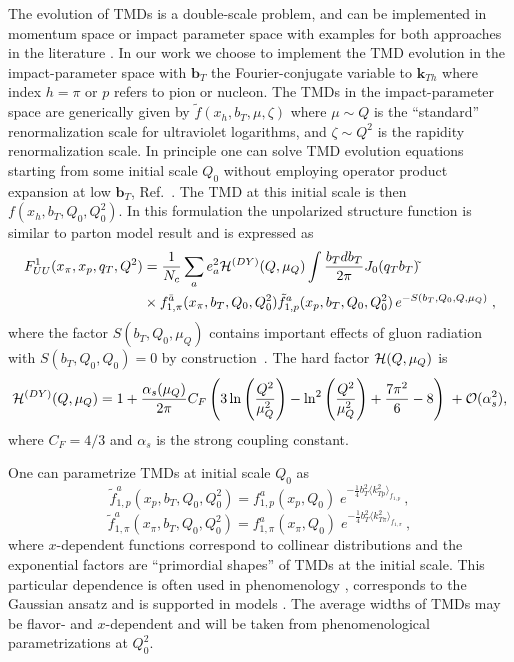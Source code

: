 \documentclass[a4paper]{article}
\newcommand{\be}{\begin{equation}}
\newcommand{\ee}{\end{equation}}
\newcommand{\la}{\langle}
\newcommand{\ra}{\rangle}
\def\kTh{\bm k_{Th}}
\def\avkTpi{\la k_{T \pi}^2 \ra}
\def\avkTN{\la k_{Tp}^2 \ra}
\newcommand{\ps}[1]{{\color{magenta}#1}}
\begin{document}
The evolution of TMDs is a double-scale problem, and 
can be implemented in momentum space or impact 
parameter space with examples for both approaches in the literature 
\cite{Collins:1981va,Aybat:2011zv,Angeles-Martinez:2015sea,Scimemi:2019cmh,Bacchetta:2019sam,Ebert:2020dfc}.
In our work we choose to implement the TMD evolution
in the impact-parameter space with ${\bm b_{T}}$ the 
Fourier-conjugate variable to $\kTh$
where index $h = \pi$ or $p$ refers to pion or nucleon. 
The TMDs in the impact-parameter
space are generically given by $\tilde f(x_h,{ b_{T}},\mu,\zeta)$ where
$\mu\sim Q$ is the ``standard'' renormalization scale for ultraviolet logarithms, 
and $\zeta\sim Q^2$ is the rapidity renormalization scale.
In principle one can solve TMD evolution equations starting from some 
initial scale $Q_0$ without employing operator product expansion at low 
${\bm b_{T}}$,   Ref.~\cite{Collins:2014jpa}. 
The TMD at this initial scale is then $f(x_h,{b_{T}},Q_0,Q_0^2)$. 
In this formulation the unpolarized structure function is similar to 
parton model result and is 
expressed as~\cite{Collins:2014jpa}
\begin{align}
\label{FUUbspace} F_{UU}^1(x_\pi,x_p,q_T,Q^2) &= \frac{1}{N_c} \sum_a e_a^2 {\cal H}^{(DY)}(Q,\mu_Q)\int \frac{b_{T} d b_{T}}{2\pi} J_0 (q_T b_{T}) \tilde  \nonumber \\ 
   & \times  f_{1,\pi}^{\bar a}(x_\pi,{b_{T}},Q_0,Q_0^2) \tilde f_{1,p}^a(x_p,{b_{T}},Q_0,Q_0^2)\, e^{-S(b_{T},Q_0,Q,\mu_Q)}\; ,
\end{align}
where the factor $S(b_T,Q_0,\mu_Q)$ contains important effects of gluon
radiation with $S(b_T,Q_0,Q_0) = 0$ by construction~\cite{Collins:2014jpa}. \ps{The hard factor ${\cal H}(Q,\mu_Q)$ is~\cite{Collins:2017oxh}
\begin{align}
    {\cal H}^{(DY)}(Q,\mu_Q) = 1 + \frac{\alpha_s(\mu_Q)}{2 \pi} C_F \left( 3 \ln \left( \frac{Q^2}{\mu_Q^2}\right) - \ln^2 \left( \frac{Q^2}{\mu_Q^2}\right) +\frac{7\pi^2}{6} - 8\right)\; + {\cal O} (\alpha_s^2) ,
    \label{eq:hard}
\end{align}
where $C_F=4/3$ and $\alpha_s$ is the strong coupling constant.}

One can parametrize TMDs at initial scale $Q_0$ as 
\be
 \label{Ansatzbspace} 
     \tilde f_{1,p}^{a}(
     x_p,{ b_{T}},Q_0,Q_0^2) = f_{1,p}^{a} (
     x_p,Q_0) \;
     e^{-\frac14 b_{T}^2
     \avkTN_{f_{1,p}}} \,,
\ee
\be
 \label{Ansatzbspace1} 
     \tilde f_{1,\pi}^{a}(x_\pi,{ b_{T}},Q_0,Q_0^2) = f_{1,\pi}^{a} (x_\pi,Q_0) \; e^{-\frac14 b_{T}^2\avkTpi_{f_{1,\pi}}} \,,
\ee
where $x$-dependent functions correspond to collinear distributions and the exponential factors are ``primordial shapes'' of TMDs at the initial scale. This particular dependence is often used in phenomenology \cite{DAlesio:2004eso,Schweitzer:2010tt},
corresponds to the Gaussian ansatz and is supported in models
\cite{Avakian:2010br,Efremov:2010mt,Pasquini:2011tk,Pasquini:2014ppa,Schweitzer:2012hh}. The average widths of TMDs may be flavor-
and $x$-dependent and will be taken from
phenomenological parametrizations at $Q_0^2$. 
\end{document}
